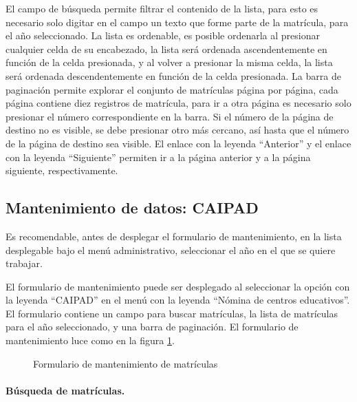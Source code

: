 \documentclass[a4paper, 9pt, conference]{article}              %
\begin{document}
El campo de b\'usqueda permite filtrar el contenido de la lista, para esto es necesario solo digitar en el campo un texto que forme parte de la matr\'icula, para el a\~no seleccionado. La lista es ordenable, es posible ordenarla al presionar cualquier celda de su encabezado, la lista ser\'a ordenada ascendentemente en funci\'on de la celda presionada, y al volver a presionar la misma celda, la lista ser\'a ordenada descendentemente en funci\'on de la celda presionada. La barra de paginaci\'on permite explorar el conjunto de matr\'iculas p\'agina por p\'agina, cada p\'agina contiene diez registros de matr\'icula, para ir a otra p\'agina es necesario solo presionar el n\'umero correspondiente en la barra. Si el n\'umero de la p\'agina de destino no es visible, se debe presionar otro m\'as cercano, as\'i hasta que el n\'umero de la p\'agina de destino sea visible. El enlace con la leyenda ``Anterior'' y el enlace con la leyenda ``Siguiente'' permiten ir a la p\'agina anterior y a la p\'agina siguiente, respectivamente.


\subsection{Mantenimiento de datos: CAIPAD}
Es recomendable, antes de desplegar el formulario de mantenimiento, en la lista desplegable bajo el men\'u administrativo, seleccionar el a\~no en el que se quiere trabajar.

El formulario de mantenimiento puede ser desplegado al seleccionar la opci\'on con la leyenda ``CAIPAD'' en el men\'u con la leyenda ``N\'omina de centros educativos''. El formulario contiene un campo para buscar matr\'iculas, la lista de matr\'iculas para el a\~no seleccionado, y una barra de paginaci\'on. El formulario de mantenimiento luce como en la figura \ref{fig:geoenrollments6}.

\begin{figure}
	\centering
		\caption{Formulario de mantenimiento de matr\'iculas}
	\label{fig:geoenrollments6}
\end{figure}


\paragraph{B\'usqueda de matr\'iculas.}
\end{document}
